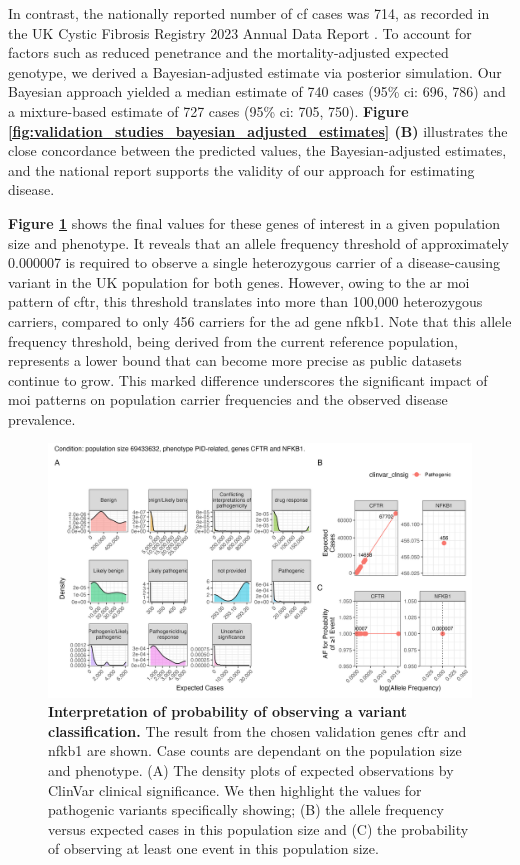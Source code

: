 In contrast, the nationally reported number of \ac{cf} cases was 714, as recorded in the UK Cystic Fibrosis Registry 2023 Annual Data Report
\cite{naito2023uk}. To account for factors such as reduced penetrance and the mortality-adjusted expected genotype, we derived a Bayesian-adjusted estimate via posterior simulation. Our Bayesian approach yielded a median estimate of 740 cases (95\% \ac{ci}: 696, 786) and a mixture-based estimate of 727 cases (95\% \ac{ci}: 705, 750).
\textbf{Figure \ref{fig:validation_studies_bayesian_adjusted_estimates} (B)} illustrates the close concordance between the predicted values, the Bayesian-adjusted estimates, and the national report supports the validity of our approach for estimating disease.

\textbf{Figure \ref{fig:validation_scatter_dense}} shows the final values for these genes of interest in a given population size and phenotype. It reveals that an allele frequency threshold of approximately 0.000007 is required to observe a single heterozygous carrier of a disease-causing variant in the UK population for both genes. However, owing to the \ac{ar} \ac{moi} pattern of \ac{cftr}, this threshold translates into more than 100,000 heterozygous carriers, compared to only 456 carriers for the \ac{ad} gene \ac{nfkb1}. Note that this allele frequency threshold, being derived from the current reference population, represents a lower bound that can become more precise as public datasets continue to grow. This marked difference underscores the significant impact of \ac{moi} patterns on population carrier frequencies and the observed disease prevalence.

\begin{figure}[h]
  \centering
  \includegraphics[width=\textwidth]{../images/validation_studies_scatterdense_expected_prob.png}
  \caption{\textbf{Interpretation of probability of observing a variant classification.} 
 The result from the chosen validation genes \ac{cftr} and \ac{nfkb1} are shown. 
 Case counts are dependant on the population size and phenotype.
(A) The density plots of expected observations by ClinVar clinical significance. 
We then highlight the values for pathogenic variants specifically showing;
(B) the allele frequency versus expected cases in this population size and
(C) the probability of observing at least one event in this population size.}
  \label{fig:validation_scatter_dense}
\end{figure}

